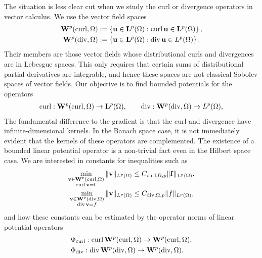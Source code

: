 \documentclass[10pt,letterpaper]{article}
\begin{document}
The situation is less clear cut when we study the curl or divergence operators in vector calculus.
We use the vector field spaces
\begin{align*}
    {\mathbf W}^{p}(\operatorname{curl},\Omega) &:= \left\{ {\mathbf u} \in {\mathbf L}^{p}(\Omega) : \operatorname{curl} {\mathbf u} \in {\mathbf L}^{p}(\Omega) \right\}
    ,
    \\
    {\mathbf W}^{p}(\operatorname{div},\Omega) &:= \left\{ {\mathbf u} \in {\mathbf L}^{p}(\Omega) : \operatorname{div} {\mathbf u} \in L^{p}(\Omega) \right\}
    .
\end{align*}
Their members are those vector fields whose distributional curls and divergences are in Lebesgue spaces. 
This only requires that certain sums of distributional partial derivatives are integrable, 
and hence these spaces are not classical Sobolev spaces of vector fields. 
Our objective is to find bounded potentials for the operators 
\begin{align*}
    \operatorname{curl} : {\mathbf W}^{p}(\operatorname{curl},\Omega) \rightarrow {\mathbf L}^{p}(\Omega),
    \qquad 
    \operatorname{div} : {\mathbf W}^{p}(\operatorname{div},\Omega) \rightarrow L^{p}(\Omega),
\end{align*}
The fundamental difference to the gradient is that the curl and divergence have infinite-dimensional kernels. 
In the Banach space case, it is not immediately evident that the kernels of these operators are complemented.
The existence of a bounded linear potential operator is a non-trivial fact even in the Hilbert space case.
We are interested in constants for inequalities such as 
\begin{align*}
    \min\limits_{ \substack{ \bfv \in \bfW^{p}(\curl,\Omega) \\ \curl \bfv = \bff } } 
    \| \bfv \|_{L^{p}(\Omega)}
    &\leq 
    C_{\curl,\Omega,p}
    \| \bff \|_{L^{p}(\Omega)}
    ,
    \\%
    \min\limits_{ \substack{ \bfv \in \bfW^{p}(\divergence,\Omega) \\ \divergence \bfv = f } } 
    \| \bfv \|_{L^{p}(\Omega)}
    &\leq 
    C_{\divergence,\Omega,p}
    \| f \|_{L^{p}(\Omega)}
    ,
\end{align*}
and how these constants can be estimated by the operator norms of linear potential operators 
\begin{align*}
    &\Phi_{\operatorname{curl}} : \operatorname{curl} {\mathbf W}^{p}(\operatorname{curl},\Omega) \rightarrow {\mathbf W}^{p}(\operatorname{curl},\Omega)
    ,
    \\
    &\Phi_{\operatorname{div}} : \operatorname{div} {\mathbf W}^{p}(\operatorname{div},\Omega) \rightarrow {\mathbf W}^{p}(\operatorname{div},\Omega)
    .
\end{align*}
\end{document}
